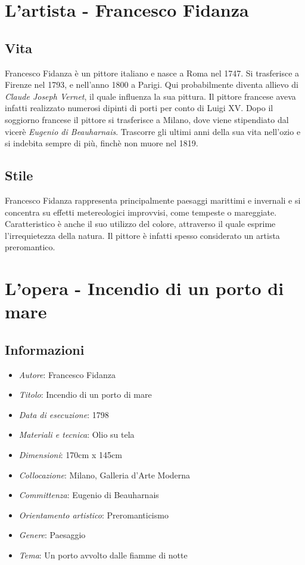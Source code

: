 \documentclass[12pt]{article}
\begin{document}
\newpage
\section*{L'artista - Francesco Fidanza}
\subsection*{Vita}
Francesco Fidanza è un pittore italiano e nasce a Roma nel 1747. Si trasferisce a Firenze nel 1793, e nell'anno 1800 a Parigi. Qui probabilmente diventa allievo di \textit{Claude Joseph Vernet}, il quale influenza la sua pittura. Il pittore francese aveva infatti realizzato numerosi dipinti di porti per conto di Luigi XV. Dopo il soggiorno francese il pittore si trasferisce a Milano, dove viene stipendiato dal vicerè \textit{Eugenio di Beauharnais}. Trascorre gli ultimi anni della sua vita nell'ozio e si indebita sempre di più, finchè non muore nel 1819.

\subsection*{Stile}
Francesco Fidanza rappresenta principalmente paesaggi marittimi e invernali e si concentra su effetti metereologici improvvisi, come tempeste o mareggiate. Caratteristico è anche il suo utilizzo del colore, attraverso il quale esprime l'irrequietezza della natura. Il pittore è infatti spesso considerato un artista preromantico.


\newpage
\section*{L'opera - Incendio di un porto di mare}

\subsection*{Informazioni}
\begin{itemize}
    \item \textit{Autore}: Francesco Fidanza
    \item \textit{Titolo}: Incendio di un porto di mare
    \item \textit{Data di esecuzione}: 1798
    \item \textit{Materiali e tecnica}: Olio su tela
    \item \textit{Dimensioni}: 170cm x 145cm
    \item \textit{Collocazione}: Milano, Galleria d'Arte Moderna
    \item \textit{Committenza}: Eugenio di Beauharnais
    \item \textit{Orientamento artistico}: Preromanticismo
    \item \textit{Genere}: Paesaggio
    \item \textit{Tema}: Un porto avvolto dalle fiamme di notte
\end{itemize}
\end{document}
